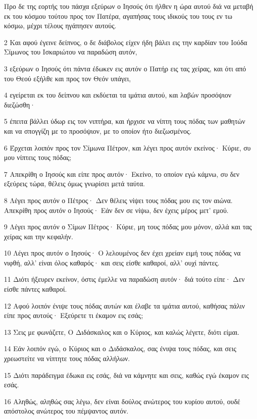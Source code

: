\par Προ δε της εορτής του πάσχα εξεύρων ο Ιησούς ότι ήλθεν η ώρα αυτού διά να μεταβή εκ του κόσμου τούτου προς τον Πατέρα, αγαπήσας τους ιδικούς του τους εν τω κόσμω, μέχρι τέλους ηγάπησεν αυτούς.
\par 2 Και αφού έγεινε δείπνος, ο δε διάβολος είχεν ήδη βάλει εις την καρδίαν του Ιούδα Σίμωνος του Ισκαριώτου να παραδώση αυτόν,
\par 3 εξεύρων ο Ιησούς ότι πάντα έδωκεν εις αυτόν ο Πατήρ εις τας χείρας, και ότι από του Θεού εξήλθε και προς τον Θεόν υπάγει,
\par 4 εγείρεται εκ του δείπνου και εκδύεται τα ιμάτια αυτού, και λαβών προσόψιον διεζώσθη·
\par 5 έπειτα βάλλει ύδωρ εις τον νιπτήρα, και ήρχισε να νίπτη τους πόδας των μαθητών και να σπογγίζη με το προσόψιον, με το οποίον ήτο διεζωσμένος.
\par 6 Έρχεται λοιπόν προς τον Σίμωνα Πέτρον, και λέγει προς αυτόν εκείνος· Κύριε, συ μου νίπτεις τους πόδας;
\par 7 Απεκρίθη ο Ιησούς και είπε προς αυτόν· Εκείνο, το οποίον εγώ κάμνω, συ δεν εξεύρεις τώρα, θέλεις όμως γνωρίσει μετά ταύτα.
\par 8 Λέγει προς αυτόν ο Πέτρος· Δεν θέλεις νίψει τους πόδας μου εις τον αιώνα. Απεκρίθη προς αυτόν ο Ιησούς· Εάν δεν σε νίψω, δεν έχεις μέρος μετ' εμού.
\par 9 Λέγει προς αυτόν ο Σίμων Πέτρος· Κύριε, μη τους πόδας μου μόνον, αλλά και τας χείρας και την κεφαλήν.
\par 10 Λέγει προς αυτόν ο Ιησούς· Ο λελουμένος δεν έχει χρείαν ειμή τους πόδας να νιφθή, αλλ' είναι όλος καθαρός· και σεις είσθε καθαροί, αλλ' ουχί πάντες.
\par 11 Διότι ήξευρεν εκείνον, όστις έμελλε να παραδώση αυτόν· διά τούτο είπε· Δεν είσθε πάντες καθαροί.
\par 12 Αφού λοιπόν ένιψε τους πόδας αυτών και έλαβε τα ιμάτια αυτού, καθήσας πάλιν είπε προς αυτούς· Εξεύρετε τι έκαμον εις εσάς;
\par 13 Σεις με φωνάζετε, Ο Διδάσκαλος και ο Κύριος, και καλώς λέγετε, διότι είμαι.
\par 14 Εάν λοιπόν εγώ, ο Κύριος και ο Διδάσκαλος, σας ένιψα τους πόδας, και σεις χρεωστείτε να νίπτητε τους πόδας αλλήλων.
\par 15 Διότι παράδειγμα έδωκα εις εσάς, διά να κάμνητε και σεις, καθώς εγώ έκαμον εις εσάς.
\par 16 Αληθώς, αληθώς σας λέγω, δεν είναι δούλος ανώτερος του κυρίου αυτού, ουδέ απόστολος ανώτερος του πέμψαντος αυτόν.
